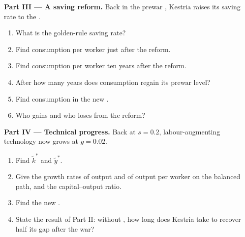 \begin{problem}
\medskip\noindent\textbf{Part III --- A saving reform.} Back in the prewar , Kestria raises its saving rate to the .
\begin{enumerate}[resume]
  \item What is the golden-rule saving rate?
  \item Find consumption per worker just after the reform.
  \item Find consumption per worker ten years after the reform.
  \item After how many years does consumption regain its prewar level?
  \item Find consumption in the new .
  \item Who gains and who loses from the reform?
\end{enumerate}

\medskip\noindent\textbf{Part IV --- Technical progress.} Back at $s = 0.2$,
labour-augmenting technology now grows at $g = 0.02$.
\begin{enumerate}[resume]
  \item Find $\tilde k^*$ and $\tilde y^*$.
  \item Give the growth rates of output and of output per worker on the balanced path, and the capital--output ratio.
  \item Find the new .
  \item State the result of Part II: without , how long does Kestria take to recover half its gap after the war?
\end{enumerate}
\end{problem}
